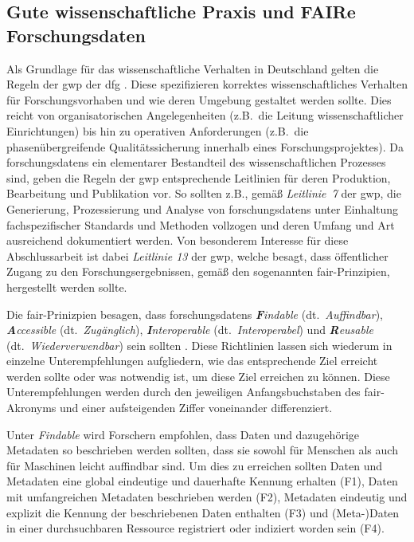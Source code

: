 \subsection{Gute wissenschaftliche Praxis und
FAIRe Forschungsdaten}\label{sec:forschungsstand-basics-gwp-fair}
Als Grundlage für das wissenschaftliche Verhalten in Deutschland gelten die Regeln der \gls{gwp} der \gls{dfg} \autocite{dfg-gwp}.
Diese spezifizieren korrektes wissenschaftliches Verhalten für Forschungsvorhaben und wie deren Umgebung gestaltet werden sollte.
Dies reicht von organisatorischen Angelegenheiten (z.B.~die Leitung wissenschaftlicher Einrichtungen) bis hin zu operativen Anforderungen (z.B.~die phasenübergreifende Qualitätssicherung innerhalb eines Forschungsprojektes).
Da \glspl{forschungsdaten} ein elementarer Bestandteil des wissenschaftlichen Prozesses sind, geben die Regeln der \gls{gwp} entsprechende Leitlinien für deren Produktion, Bearbeitung und Publikation vor.
So sollten z.B., gemäß \textit{Leitlinie~7} der \gls{gwp}, die Generierung, Prozessierung und Analyse von \glspl{forschungsdaten} unter Einhaltung fachspezifischer Standards und Methoden vollzogen und deren Umfang und Art ausreichend dokumentiert werden.
Von besonderem Interesse für diese Abschlussarbeit ist dabei \textit{Leitlinie 13} der \gls{gwp}, welche besagt, dass öffentlicher Zugang zu den Forschungsergebnissen, gemäß den sogenannten \gls{fair}-Prinzipien, hergestellt werden sollte.

Die \gls{fair}-Prinizpien besagen, dass \glspl{forschungsdaten} \textit{\textbf{F}indable} (dt.~\textit{Auffindbar}), \textit{\textbf{A}ccessible} (dt.~\textit{Zugänglich}), \textit{\textbf{I}nteroperable} (dt.~\textit{Interoperabel}) und \textit {\textbf{R}eusable} (dt.~\textit{Wiederverwendbar}) sein sollten \autocite{Wilkinson2016}.
Diese Richtlinien lassen sich wiederum in einzelne Unterempfehlungen aufgliedern, wie das entsprechende Ziel erreicht werden sollte oder was notwendig ist, um diese Ziel erreichen zu können.
Diese Unterempfehlungen werden durch den jeweiligen Anfangsbuchstaben des \gls{fair}-Akronyms und einer aufsteigenden Ziffer voneinander differenziert.

Unter \textit{Findable} wird Forschern empfohlen, dass Daten und dazugehörige Metadaten so beschrieben werden sollten, dass sie sowohl für Menschen als auch für Maschinen leicht auffindbar sind.
Um dies zu erreichen sollten Daten und Metadaten eine global eindeutige und dauerhafte Kennung erhalten (F1), Daten mit umfangreichen Metadaten beschrieben werden (F2), Metadaten eindeutig und explizit die Kennung der beschriebenen Daten enthalten (F3) und (Meta-)Daten in einer durchsuchbaren Ressource registriert oder indiziert worden sein (F4).

